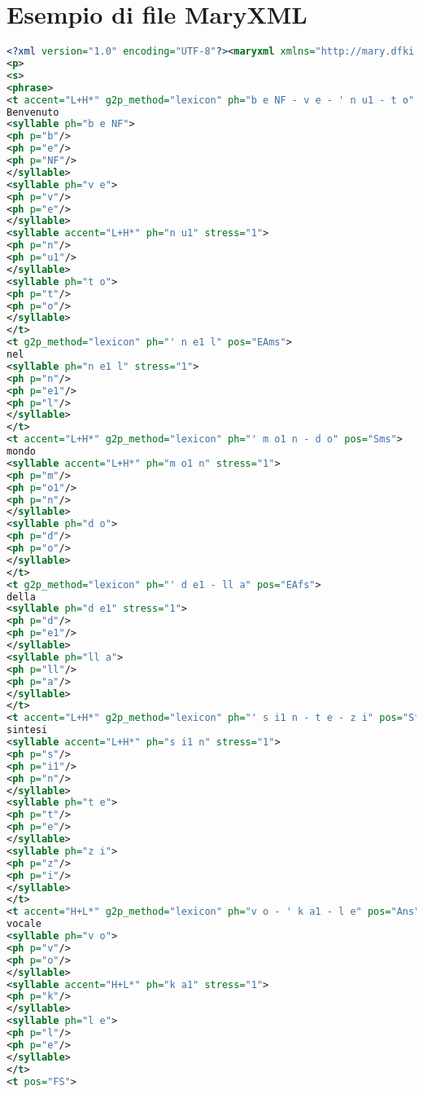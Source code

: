
\chapter{Esempio di file MaryXML}
\label{app:appc}

\begin{lstlisting}[language=XML]
<?xml version="1.0" encoding="UTF-8"?><maryxml xmlns="http://mary.dfki.de/2002/MaryXML" xmlns:xsi="http://www.w3.org/2001/XMLSchema-instance" version="0.5" xml:lang="it">
<p>
<s>
<phrase>
<t accent="L+H*" g2p_method="lexicon" ph="b e NF - v e - ' n u1 - t o" pos="SP">
Benvenuto
<syllable ph="b e NF">
<ph p="b"/>
<ph p="e"/>
<ph p="NF"/>
</syllable>
<syllable ph="v e">
<ph p="v"/>
<ph p="e"/>
</syllable>
<syllable accent="L+H*" ph="n u1" stress="1">
<ph p="n"/>
<ph p="u1"/>
</syllable>
<syllable ph="t o">
<ph p="t"/>
<ph p="o"/>
</syllable>
</t>
<t g2p_method="lexicon" ph="' n e1 l" pos="EAms">
nel
<syllable ph="n e1 l" stress="1">
<ph p="n"/>
<ph p="e1"/>
<ph p="l"/>
</syllable>
</t>
<t accent="L+H*" g2p_method="lexicon" ph="' m o1 n - d o" pos="Sms">
mondo
<syllable accent="L+H*" ph="m o1 n" stress="1">
<ph p="m"/>
<ph p="o1"/>
<ph p="n"/>
</syllable>
<syllable ph="d o">
<ph p="d"/>
<ph p="o"/>
</syllable>
</t>
<t g2p_method="lexicon" ph="' d e1 - ll a" pos="EAfs">
della
<syllable ph="d e1" stress="1">
<ph p="d"/>
<ph p="e1"/>
</syllable>
<syllable ph="ll a">
<ph p="ll"/>
<ph p="a"/>
</syllable>
</t>
<t accent="L+H*" g2p_method="lexicon" ph="' s i1 n - t e - z i" pos="Sfn">
sintesi
<syllable accent="L+H*" ph="s i1 n" stress="1">
<ph p="s"/>
<ph p="i1"/>
<ph p="n"/>
</syllable>
<syllable ph="t e">
<ph p="t"/>
<ph p="e"/>
</syllable>
<syllable ph="z i">
<ph p="z"/>
<ph p="i"/>
</syllable>
</t>
<t accent="H+L*" g2p_method="lexicon" ph="v o - ' k a1 - l e" pos="Ans">
vocale
<syllable ph="v o">
<ph p="v"/>
<ph p="o"/>
</syllable>
<syllable accent="H+L*" ph="k a1" stress="1">
<ph p="k"/>
</syllable>
<syllable ph="l e">
<ph p="l"/>
<ph p="e"/>
</syllable>
</t>
<t pos="FS">

\end{lstlisting}
